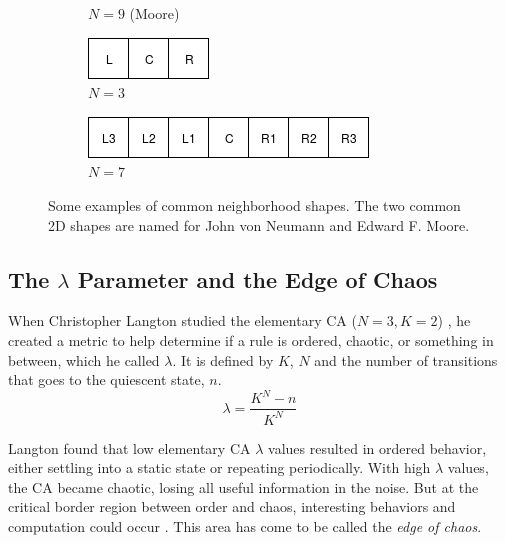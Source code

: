 \begin{figure}
\begin{subfigure}[t]{.175\columnwidth}
\caption{$N=9$ (Moore)}
\end{subfigure}\hfill%
\begin{subfigure}[t]{.175\columnwidth}
\centering
\includegraphics[width=\columnwidth]{fig/LCR}
\caption{$N=3$}
\end{subfigure}\hfill%
\begin{subfigure}[t]{.40\columnwidth}
\centering
\includegraphics[width=\columnwidth]{fig/LLLCRRR}
\caption{$N=7$}
\end{subfigure}\hfill%

\caption[Some CA neighborhoods]{Some examples of common neighborhood shapes. The two common 2D shapes are named for John von Neumann and Edward F. Moore.
}
\label{fig:neighborhoods}
\end{figure}

\subsection{The $\lambda$ Parameter and the Edge of Chaos}
When Christopher Langton studied the elementary CA ($N=3, K=2$) \cite{langton-1990},
he created a metric to help determine if a rule is ordered, chaotic, or something in between, which he called $\lambda$.
It is defined by $K$, $N$ and the number of transitions that goes to the quiescent state, $n$.
\begin{equation}\label{eq:lambda}
    \lambda = \frac{K^N - n}{K^N}
\end{equation}

Langton found that low elementary CA $\lambda$ values resulted in ordered behavior, either settling into a static state or repeating periodically.
With high $\lambda$ values, the CA became chaotic, losing all useful information in the noise.
But at the critical border region between order and chaos, interesting behaviors and computation could occur \cite{langton-1990}.
This area has come to be called the \textit{edge of chaos}.

